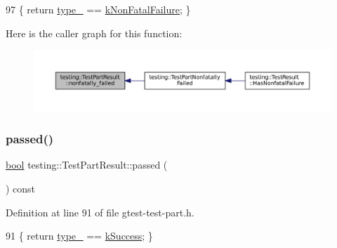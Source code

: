 \begin{DoxyCode}
97 \{ \textcolor{keywordflow}{return} \hyperlink{classtesting_1_1TestPartResult_a4ee7ac490fe4f10e222fa08c3fa25437}{type\_} == \hyperlink{classtesting_1_1TestPartResult_a65ae656b33fdfdfffaf34858778a52d5a00a755614f8ec3f78b2e951f8c91cd92}{kNonFatalFailure}; \}
\end{DoxyCode}
Here is the caller graph for this function\+:
\nopagebreak
\begin{figure}[H]
\begin{center}
\leavevmode
\includegraphics[width=350pt]{classtesting_1_1TestPartResult_a6197c7f6672acc1cfdf580eb1f2183ac_icgraph}
\end{center}
\end{figure}
\mbox{\label{classtesting_1_1TestPartResult_ac90edd5ea9cc4bb986a1eb2b5e1d53de}} 
\subsubsection{\texorpdfstring{passed()}{passed()}}
{\footnotesize\ttfamily \hyperlink{classbool}{bool} testing\+::\+Test\+Part\+Result\+::passed (\begin{DoxyParamCaption}{ }\end{DoxyParamCaption}) const\hspace{0.3cm}{\ttfamily [inline]}}



Definition at line 91 of file gtest-\/test-\/part.\+h.


\begin{DoxyCode}
91 \{ \textcolor{keywordflow}{return} \hyperlink{classtesting_1_1TestPartResult_a4ee7ac490fe4f10e222fa08c3fa25437}{type\_} == \hyperlink{classtesting_1_1TestPartResult_a65ae656b33fdfdfffaf34858778a52d5a8fa3d06b2baad8bf7c1f17dea314983e}{kSuccess}; \}
\end{DoxyCode}
\mbox{\label{classtesting_1_1TestPartResult_a655ab538e510434ba557ad66c35aa42c}} 

